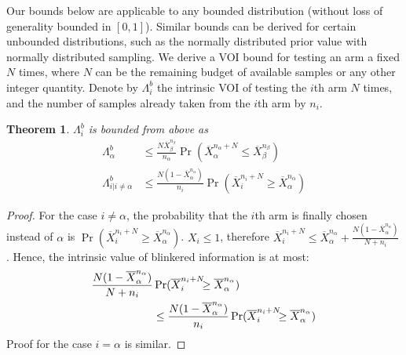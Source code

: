 \documentclass[]{article}
\newtheorem{thm}{Theorem}
\begin{document}
Our bounds below are applicable to any bounded distribution (without loss of generality 
bounded in $[0,1]$). Similar
bounds can be derived for certain unbounded distributions, such as the
normally distributed prior value with normally distributed
sampling.
We derive a VOI bound for testing an arm a fixed $N$ times,
where $N$ can be the remaining budget of available samples or
any other integer quantity.
Denote by  $\Lambda_i^b$ the intrinsic VOI of testing the $i$th arm
$N$ times, and the number of
samples already taken from the $i$th arm by $n_i$.
\begin{thm} $\Lambda_i^b$ is bounded from above as
\begin{align}
\label{eqn:thm-be}
  \Lambda_\alpha^b&\le \frac {N \overline X_\beta^{n_\beta}} {n_\alpha} \Pr(\overline X_\alpha^{n_\alpha+N}\le\overline X_\beta^{n_\beta})\nonumber\\
\Lambda_{i|i\ne\alpha}^b&\le \frac {N(1-\overline X_\alpha^{n_\alpha})} {n_i}\Pr(\overline   X_i^{{n_i}+N}\ge\overline X_\alpha^{n_\alpha})
\end{align}
\vspace{-24pt}
\label{thm:be}
\end{thm}
\begin{hiddenproof}
	\vspace{-2em}
	\begin{proof} For the case $i\ne \alpha$, the probability that the
	  $i$th arm is finally chosen instead of $\alpha$ is
	  $\Pr(\overline X_i^{n_i+N} \ge \overline X_\alpha^{n_\alpha})$. $X_i \le 1$,
	  therefore $\overline X_i^{n_i+N}\le \overline
	  X_\alpha^{n_\alpha}+\frac {N(1-\overline X_\alpha^{n_\alpha})} {N+n_i}$. Hence, the intrinsic value of blinkered
	  information is at most: 
	\begin{align}
	\label{eq:simplistic}
	\frac{ N(1-\overline  X_\alpha^{n_\alpha})}
	  {N+n_i}&\Pr(\overline X_i^{{n_i}+N}\hspace{-0.5em}\ge\overline X_\alpha^{n_\alpha})\nonumber \\
	&\le\frac{ N(1-\overline  X_\alpha^{n_\alpha})}
	{n_i}\Pr(\overline X_i^{{n_i}+N}\hspace{-0.5em}\ge\overline X_\alpha^{n_\alpha})
	\end{align}
	  Proof for the case $i=\alpha$ is similar.
	\end{proof}		
\end{hiddenproof}
\end{document}
